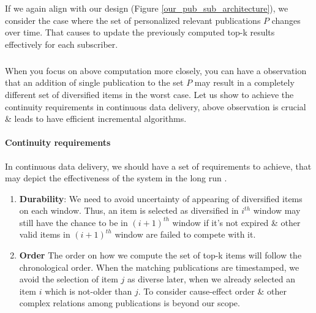 \documentclass[a4paper,12pt,oneside]{book}
\theoremstyle{definition}
\theoremstyle{remark}
\begin{document}
If we again align with our design (Figure \ref{our_pub_sub_architecture}), we consider the case where the set of personalized relevant publications $P$ changes over time. That causes to update the previously computed top-k results effectively for each subscriber. 

\subparagraph*{}
When you focus on above computation more closely, you can have a observation that an addition of single publication to the set $P$ may result in a completely different set of diversified items in the worst case. Let us show to achieve the continuity requirements in continuous data delivery, above observation is crucial \& leads to have efficient incremental algorithms.

\paragraph{Continuity requirements} 
In continuous data delivery, we should have a set of requirements to achieve, that may depict the effectiveness of the system in the long run \cite{Drosou2014ExtendedDiversity}. 
\begin{enumerate}[label=(\roman*)]
\item \textbf{Durability}: We need to avoid uncertainty of appearing of diversified items on each window. Thus, an item is selected as diversified in $i^{th}$ window may still have the chance to be in $(i+1)^{th}$ window if it's not expired \& other valid items in $(i+1)^{th}$ window are failed to compete with it.
\item \textbf{Order} The order on how we compute the set of top-k items will follow the chronological order. When the matching publications are timestamped, we avoid the selection of item $j$ as diverse later, when we already selected an item $i$ which is not-older than $j$. To consider cause-effect order \& other complex relations among publications is beyond our scope.
\end{enumerate}
\end{document}
